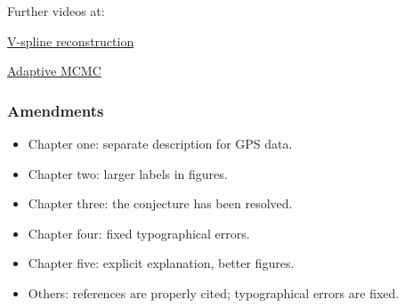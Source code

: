 \documentclass{beamer}
\begin{document}




\begin{frame}

Further videos at:

\href{https://www.youtube.com/watch?v=lQOSt8HrYRU&t=61s}{V-spline reconstruction} 

\href{https://www.youtube.com/watch?v=CF6Sut3G6eI&t=67s}{Adaptive MCMC} 

\end{frame}




\begin{frame}
\frametitle{Amendments}
\begin{itemize}
	\item Chapter one: separate description for GPS data.
	\item Chapter two: larger labels in figures.
	\item Chapter three: the conjecture has been resolved.
	\item Chapter four: fixed typographical errors.
	\item Chapter five: explicit explanation, better figures.
	\item Others: references are properly cited; typographical errors are fixed.
\end{itemize}
\end{frame}
\end{document}
